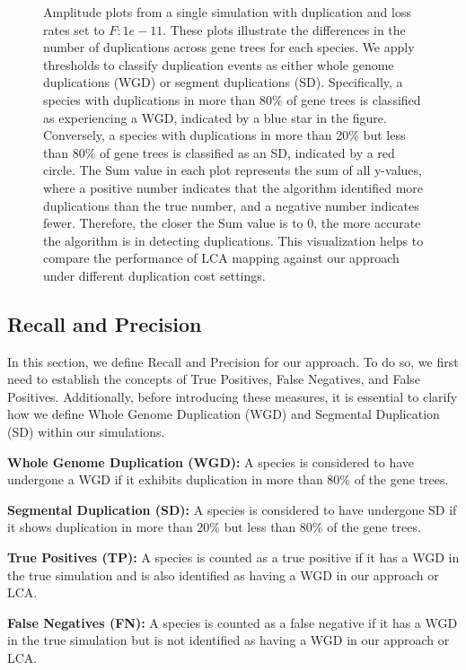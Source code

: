 \documentclass[10pt]{article}
\begin{document}
\begin{figure}[h!]
    \caption{
    Amplitude plots from a single simulation with duplication and loss rates set to $F:1e-11$. These plots illustrate the differences in the number of duplications across gene trees for each species. We apply thresholds to classify duplication events as either whole genome duplications (WGD) or segment duplications (SD). Specifically, a species with duplications in more than 80\% of gene trees is classified as experiencing a WGD, indicated by a blue star in the figure. Conversely, a species with duplications in more than 20\% but less than 80\% of gene trees is classified as an SD, indicated by a red circle. The Sum value in each plot represents the sum of all y-values, where a positive number indicates that the algorithm identified more duplications than the true number, and a negative number indicates fewer. Therefore, the closer the Sum value is to 0, the more accurate the algorithm is in detecting duplications. This visualization helps to compare the performance of LCA mapping against our approach under different duplication cost settings.
    }
    \label{fig:amp}
\end{figure}





\subsection{Recall and Precision}
In this section, we define Recall and Precision for our approach. To do so, we first need to establish the concepts of True Positives, False Negatives, and False Positives. Additionally, before introducing these measures, it is essential to clarify how we define Whole Genome Duplication (WGD) and Segmental Duplication (SD) within our simulations.

\textbf{Whole Genome Duplication (WGD):} A species is considered to have undergone a WGD if it exhibits duplication in more than 80\% of the gene trees.

\textbf{Segmental Duplication (SD):} A species is considered to have undergone SD if it shows duplication in more than 20\% but less than 80\% of the gene trees.

\textbf{True Positives (TP):} A species is counted as a true positive if it has a WGD in the true simulation and is also identified as having a WGD in our approach or LCA.

\textbf{False Negatives (FN):} A species is counted as a false negative if it has a WGD in the true simulation but is not identified as having a WGD in our approach or LCA.
\end{document}
